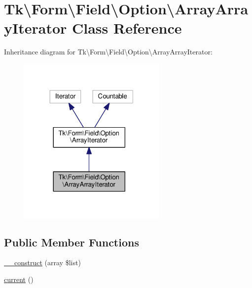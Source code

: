 \hypertarget{classTk_1_1Form_1_1Field_1_1Option_1_1ArrayArrayIterator}{\section{Tk\textbackslash{}Form\textbackslash{}Field\textbackslash{}Option\textbackslash{}Array\+Array\+Iterator Class Reference}
\label{classTk_1_1Form_1_1Field_1_1Option_1_1ArrayArrayIterator}
}


Inheritance diagram for Tk\textbackslash{}Form\textbackslash{}Field\textbackslash{}Option\textbackslash{}Array\+Array\+Iterator\+:\nopagebreak
\begin{figure}[H]
\begin{center}
\leavevmode
\includegraphics[width=206pt]{classTk_1_1Form_1_1Field_1_1Option_1_1ArrayArrayIterator__inherit__graph}
\end{center}
\end{figure}
\subsection*{Public Member Functions}
\begin{DoxyCompactItemize}
\item 
\hyperlink{classTk_1_1Form_1_1Field_1_1Option_1_1ArrayArrayIterator_a1686519fd5f76a4319498df3c4edc2a2}{\+\_\+\+\_\+construct} (array \$list)
\item 
\hyperlink{classTk_1_1Form_1_1Field_1_1Option_1_1ArrayArrayIterator_aaaf35e9b1163ac62d9d6e4d014b098a4}{current} ()
\end{DoxyCompactItemize}
